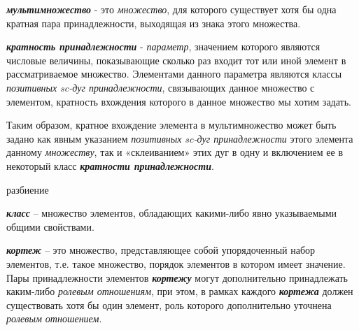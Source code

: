 \textbf{\textit{мультимножество}} - это \textit{множество}, для которого существует хотя бы одна кратная пара принадлежности, выходящая из знака этого множества.

\begin{SCn}
\end{SCn}

\textbf{\textit{кратность принадлежности}} - \textit{параметр}, значением которого являются числовые величины, показывающие сколько раз входит тот или иной элемент в рассматриваемое множество. Элементами данного параметра являются классы \textit{позитивных sc-дуг принадлежности}, связывающих данное множество с элементом, кратность вхождения которого в данное множество мы хотим задать.
	
	Таким образом, кратное вхождение элемента в мультимножество может быть задано как явным указанием \textit{позитивных sc-дуг принадлежности} этого элемента данному \textit{множеству}, так и «склеиванием» этих дуг в одну и включением ее в некоторый класс \textbf{\textit{кратности принадлежности}}.
\begin{SCn}
\begin{scnrelfromset}{разбиение}
\end{scnrelfromset}
\end{SCn}

\textbf{\textit{класс}} – множество элементов, обладающих какими-либо явно указываемыми общими свойствами.

\begin{SCn}
\end{SCn}

\textbf{\textit{кортеж}} – это множество, представляющее собой упорядоченный набор элементов, т.е. такое множество, порядок элементов в котором имеет значение. Пары принадлежности элементов \textbf{\textit{кортежу}} могут дополнительно принадлежать каким-либо \textit{ролевым отношениям}, при этом, в рамках каждого \textbf{\textit{кортежа}} должен существовать хотя бы один элемент, роль которого дополнительно уточнена \textit{ролевым отношением}.


\begin{SCn}
\end{SCn}

